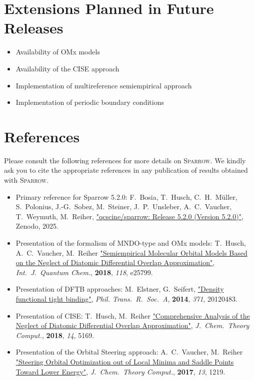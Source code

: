 \documentclass[]{tufte-book}
\begin{document}
\chapter{Extensions Planned in Future Releases}
\begin{itemize}
\item Availability of OMx models
\item Availability of the CISE approach
\item Implementation of multireference semiempirical approach
\item Implementation of periodic boundary conditions
\end{itemize}



\chapter{References}

Please consult the following references for more details on \textsc{Sparrow}.
We kindly ask you to cite the appropriate references in any publication of results obtained with \textsc{Sparrow}.
\vspace{1.0cm}

\begin{itemize}
\item Primary reference for Sparrow 5.2.0:
F.~Bosia, T.~Husch, C.~H.~M\"uller, S.~Polonius, J.-G.~Sobez, M.~Steiner, J.~P.~Unsleber, A.~C.~Vaucher, T.~Weymuth, M.~Reiher, \href{https://doi.org/10.5281/zenodo.3244105}{"qcscine/sparrow: Release 5.2.0 (Version 5.2.0)"}, Zenodo, 2025.
\item Presentation of the formalism of MNDO-type and OMx models: \newline
T.~Husch, A.~C.~Vaucher, M.~Reiher \href{https://doi.org/10.1002/qua.25799}{"Semiempirical Molecular Orbital Models Based on the Neglect of Diatomic Differential Overlap Approximation"}, \textit{Int.~J.~Quantum Chem.}, \textbf{2018}, \textit{118}, e25799.
\item Presentation of DFTB approaches: \newline
M.~Elstner, G.~Seifert, \href{https://doi.org/10.1098/rsta.2012.0483}{"Density functional tight binding"}, \textit{Phil. Trans.~R.~Soc.~A}, \textbf{2014}, \textit{371}, 20120483.
\item Presentation of CISE: \newline
T.~Husch, M.~Reiher \href{https://doi.org/10.1021/acs.jctc.8b00601}{"Comprehensive Analysis of the Neglect of Diatomic Differential Overlap Approximation"}, \textit{J.~Chem.~Theory Comput.}, \textbf{2018}, \textit{14}, 5169.
\item Presentation of the Orbital Steering approach: \newline
A.~C.~Vaucher, M.~Reiher
    \href{https://doi.org/10.1021/acs.jctc.7b00011}{"Steering Orbital
    Optimization out of Local Minima and Saddle Points Toward Lower Energy"},
    \textit{J.~Chem.~Theory Comput.}, \textbf{2017}, \textit{13}, 1219.
\end{itemize}
\end{document}
